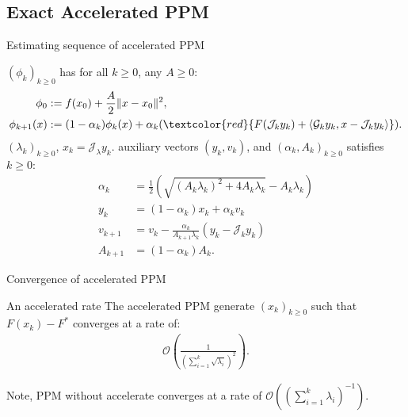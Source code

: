 \documentclass[11pt]{beamer}
\begin{document}
    \subsection{Exact Accelerated PPM}
        \begin{frame}{Estimating sequence of accelerated PPM}
            \begin{definition}
                {\small
                    \label{def:nes-est-seq-acc-ppm}
                    $(\phi_k)_{k \ge0}$ has for all $k \ge0$, any $A \ge 0$: 
                    \begin{align*}
                        \phi_0 &:= f(x_0) + \frac{A}{2}\Vert x - x_0\Vert^2, 
                        \\
                        \phi_{k + 1}(x) &:= 
                        (1 - \alpha_k)\phi_k(x)
                        + 
                        \alpha_k(
                            \textcolor{red}
                            {
                                F(\mathcal J_k y_k) + \langle \mathcal G_k y_k, x - \mathcal J_k y_k\rangle
                            }
                        ).    
                    \end{align*}
                    $(\lambda_k)_{k \ge 0}$, $x_k = \mathcal J_\lambda y_k$. 
                    auxiliary vectors $(y_k, v_k)$, and $(\alpha_k, A_k)_{k\ge 0}$ satisfies $k\ge0$:
                    \begin{align*}
                        \alpha_k &= \frac{1}{2}\left(
                            \sqrt{(A_k\lambda_k)^2 + 4A_k \lambda_k}
                            - A_k\lambda_k
                        \right) 
                        \\
                        y_k &= (1 - \alpha_k)x_k + \alpha_k v_k
                        \\
                        v_{k + 1}
                        &= 
                        v_k - \frac{\alpha_k}{A_{k + 1}\lambda_k}(y_k - \mathcal J_k y_k)
                        \\
                        A_{k + 1} &= (1 - \alpha_k)A_k. 
                    \end{align*}
                }
            \end{definition}
        \end{frame}
        \begin{frame}{Convergence of accelerated PPM} 
            \begin{block}{An accelerated rate}
                The accelerated PPM generate $(x_k)_{k\ge 0}$ such that $F(x_k) - F^*$ converges at a rate of: 
                {\large
                \begin{align*}
                    \mathcal O\left(
                        \frac{1}{\left(
                            \sum_{i = 1}^{k}\sqrt{\lambda_i}
                        \right)^2}
                    \right). 
                \end{align*}    
                }
            \end{block}
            Note, PPM without accelerate converges at a rate of $\mathcal O((\sum_{i = 1}^{k}\lambda_i)^{-1})$. 
        \end{frame}
\end{document}
